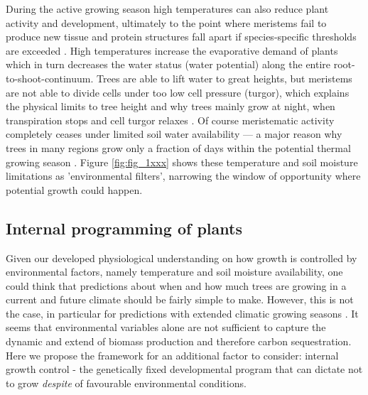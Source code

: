 \documentclass{article}
\begin{document}
		During the active growing season high temperatures can also reduce plant activity and development, ultimately to the point where meristems fail to produce new tissue and protein structures fall apart if species-specific thresholds are exceeded \citep{osullivanThermalLimitsLeaf2017}. High temperatures increase the evaporative demand of plants which in turn decreases the water status (water potential) along the entire root-to-shoot-continuum. Trees are able to lift water to great heights, but meristems are not able to divide cells under too low cell pressure (turgor), which explains the physical limits to tree height \citep{kochLimitsTreeHeight2004} and why trees mainly grow at night, when transpiration stops and cell turgor relaxes \citep{zweifelWhyTreesGrow2021}. Of course meristematic activity completely ceases under limited soil water availability --- a major reason why trees in many regions grow only  a fraction of days within the potential thermal growing season \citep{etzoldNumberGrowthDays2021}. Figure \ref{fig:fig_1xxx} shows these temperature and soil moisture limitations as 'environmental filters', narrowing the window of opportunity where potential growth could happen. \\
		
		\subsection*{Internal programming of plants}
		Given our developed physiological understanding on how growth is controlled by environmental factors, namely temperature and soil moisture availability, one could think that predictions about when and how much trees are growing in a current and future climate should be fairly simple to make. However, this is not the case, in particular for predictions with extended climatic growing seasons \citep{zohnerHowChangesSpring2021}. It seems that environmental variables alone are not sufficient to capture the dynamic and extend of biomass production and therefore carbon sequestration.  Here we propose the framework for an additional factor to consider: internal growth control - the genetically fixed developmental program that can dictate not to grow \textit{despite} of favourable environmental conditions.\\
		
\end{document}
